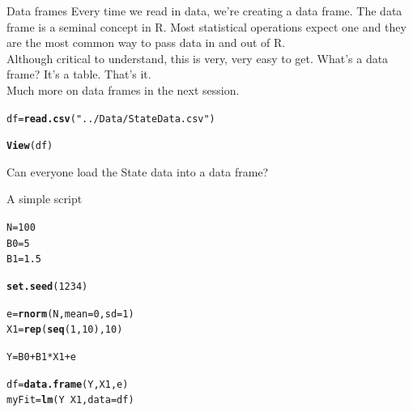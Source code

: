 \documentclass[xcolor=dvipsnames]{beamer}
\makeatletter
\newcommand{\hlnum}[1]{\textcolor[rgb]{0.686,0.059,0.569}{#1}}%
\newcommand{\hlstr}[1]{\textcolor[rgb]{0.192,0.494,0.8}{#1}}%
\newcommand{\hlopt}[1]{\textcolor[rgb]{0,0,0}{#1}}%
\newcommand{\hlstd}[1]{\textcolor[rgb]{0.345,0.345,0.345}{#1}}%
\newcommand{\hlkwb}[1]{\textcolor[rgb]{0.69,0.353,0.396}{#1}}%
\newcommand{\hlkwc}[1]{\textcolor[rgb]{0.333,0.667,0.333}{#1}}%
\newcommand{\hlkwd}[1]{\textcolor[rgb]{0.737,0.353,0.396}{\textbf{#1}}}%
\newenvironment{kframe}{%
 \def\at@end@of@kframe{}%
 \ifinner\ifhmode%
  \def\at@end@of@kframe{\end{minipage}}%
  \begin{minipage}{\columnwidth}%
 \fi\fi%
 \def\FrameCommand##1{\hskip\@totalleftmargin \hskip-\fboxsep
 \colorbox{shadecolor}{##1}\hskip-\fboxsep
     \hskip-\linewidth \hskip-\@totalleftmargin \hskip\columnwidth}%
 \MakeFramed {\advance\hsize-\width
   \@totalleftmargin\z@ \linewidth\hsize
   \@setminipage}}%
 {\par\unskip\endMakeFramed%
 \at@end@of@kframe}
\newenvironment{knitrout}{}{} %
\makeatother
\begin{document}
\begin{frame}[fragile]{Data frames}
Every time we read in data, we're creating a data frame. The data frame is a seminal concept in R. Most statistical operations expect one and they are the most common way to pass data in and out of R.
\\
Although critical to understand, this is very, very easy to get. What's a data frame? It's a table. That's it.
\\
Much more on data frames in the next session.
\begin{knitrout}
\color{fgcolor}\begin{kframe}
\begin{alltt}
\hlstd{df} \hlkwb{=} \hlkwd{read.csv}\hlstd{(}\hlstr{"../Data/StateData.csv"}\hlstd{)}
\end{alltt}
\end{kframe}
\end{knitrout}

\begin{knitrout}
\color{fgcolor}\begin{kframe}
\begin{alltt}
\hlkwd{View}\hlstd{(df)}
\end{alltt}
\end{kframe}
\end{knitrout}

\end{frame}

\begin{frame}
Can everyone load the State data into a data frame?
\end{frame}

\begin{frame}[fragile]{A simple script}
\begin{knitrout}
\color{fgcolor}\begin{kframe}
\begin{alltt}
\hlstd{N} \hlkwb{=} \hlnum{100}
\hlstd{B0} \hlkwb{=} \hlnum{5}
\hlstd{B1} \hlkwb{=} \hlnum{1.5}

\hlkwd{set.seed}\hlstd{(}\hlnum{1234}\hlstd{)}

\hlstd{e} \hlkwb{=} \hlkwd{rnorm}\hlstd{(N,} \hlkwc{mean} \hlstd{=} \hlnum{0}\hlstd{,} \hlkwc{sd} \hlstd{=} \hlnum{1}\hlstd{)}
\hlstd{X1} \hlkwb{=} \hlkwd{rep}\hlstd{(}\hlkwd{seq}\hlstd{(}\hlnum{1}\hlstd{,} \hlnum{10}\hlstd{),} \hlnum{10}\hlstd{)}

\hlstd{Y} \hlkwb{=} \hlstd{B0} \hlopt{+} \hlstd{B1} \hlopt{*} \hlstd{X1} \hlopt{+} \hlstd{e}

\hlstd{df} \hlkwb{=} \hlkwd{data.frame}\hlstd{(Y, X1, e)}
\hlstd{myFit} \hlkwb{=} \hlkwd{lm}\hlstd{(Y} \hlopt{~} \hlstd{X1,} \hlkwc{data} \hlstd{= df)}
\end{alltt}
\end{kframe}
\end{knitrout}

\end{frame}
\end{document}
